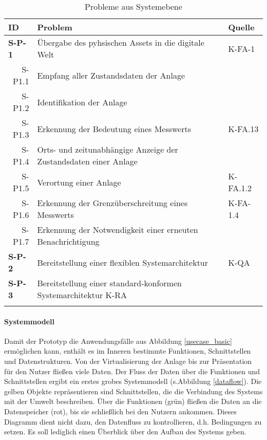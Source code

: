 \begin{table}[ht!]
  \begin{tabularx}{\textwidth}{@{}lXp{2cm}@{}}
      \toprule
      ID                & Problem & Quelle \\
      \midrule
      \textbf{S-P-1}              &       Übergabe des pyhsischen Assets in die digitale Welt               &  K-FA-1               \\
      \multicolumn{1}{r}{S-P1.1} &  Empfang aller Zustandsdaten der Anlage     \\
      \multicolumn{1}{r}{S-P1.2} &  Identifikation der Anlage     \\
      \multicolumn{1}{r}{S-P1.3} &  Erkennung der Bedeutung eines Messwerts  & K-FA.13\\
      \multicolumn{1}{r}{S-P1.4} &  Orts- und zeitunabhängige Anzeige der Zustandsdaten einer Anlage     \\
      \multicolumn{1}{r}{S-P1.5} &  Verortung einer Anlage & K-FA.1.2\\
      \multicolumn{1}{r}{S-P1.6} &  Erkennung der Grenzüberschreitung eines Messwerts & K-FA-1.4\\
      \multicolumn{1}{r}{S-P1.7} &  Erkennung der Notwendigkeit einer erneuten Benachrichtigung\\
      \textbf{S-P-2}              &  Bereitstellung einer flexiblen Systemarchitektur  & K-QA \\
      \textbf{S-P-3}              &  Bereitstellung einer standard-konformen Systemarchitektur K-RA \\
      \addlinespace
      \bottomrule
  \end{tabularx}
  \label{system_probleme}
  \caption{Probleme aus Systemebene}

\end{table}


\paragraph{Systemmodell}

Damit der Prototyp die Anwendungsfälle aus Abbildung \ref{usecase_basic} ermöglichen kann, enthält es im Inneren bestimmte Funktionen, Schnittstellen und Datenstrukturen. Von der Virtualisierung der Anlage bis zur Präsentation für den Nutzer fließen viele Daten. Der Fluss der Daten über die Funktionen und Schnittstellen ergibt ein erstes grobes Systemmodell (s.Abbildung \ref{dataflow}). Die gelben Objekte repräsentieren sind Schnittstellen, die die Verbindung des Systems mit der Umwelt beschreiben. Über die Funktionen (grün) fließen die Daten an die Datenspeicher (rot), bis sie schließlich bei den Nutzern ankommen. Dieses Diagramm dient nicht dazu, den Datenfluss zu kontrollieren, d.h. Bedingungen zu setzen. Es soll lediglich einen Überblick über den Aufbau des Systems geben.

